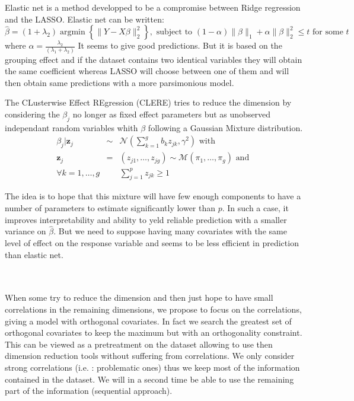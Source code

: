 \documentclass[11pt,a4paper]{article}
\begin{document}
	Elastic net\cite{zou2005regularization}	is a method developped to be a compromise between Ridge regression and the LASSO. 
	Elastic net can be written:
	\begin{equation}
		\hat{\beta}=(1+\lambda_2) \operatorname{argmin}\left\lbrace \parallel Y-X\beta \parallel_2^2 \right\rbrace, \textrm{ subject to } (1-\alpha)\parallel\beta\parallel_1+\alpha\parallel\beta\parallel_2^2\leq t \textrm{ for some } t
	\end{equation}
	where $\alpha=\frac{\lambda_2}{(\lambda_1+\lambda_2)}$
	It seems to give good predictions. But it is based on the grouping effect and if the dataset contains two identical variables they will obtain the same coefficient whereas LASSO will choose between one of them and will then obtain same predictions with a more parsimonious model. 
	
	The CLusterwise Effect REgression\cite{yengo2012variable} (CLERE) tries to reduce the dimension by considering the $\beta_j$ no longer as fixed effect parameters but as unobserved independant random variables whith $\beta$ following a Gaussian Mixture distribution. 
\begin{eqnarray}
	\beta_j|\mathbf{z}_j &\sim& \mathcal{N}(\sum_{k=1}^gb_kz_{jk},\gamma^2) \textrm{ with }\\
	\mathbf{z}_j&=&(z_{j1},\dots,z_{jg})\sim \mathcal{M}(\pi_1,\dots,\pi_g) \textrm{ and }\\
	\forall k=1,\dots ,g &&\sum_{j=1}^pz_{jk}\geq 1
\end{eqnarray}

The idea is to hope that this mixture will have few enough components to have a number of parameters to estimate significantly lower than $p$. In such a case, it improves interpretability and ability to yeld reliable prediction with a smaller variance on $\hat{\beta}$. But we need to suppose having many covariates with the same level of effect on the response variable and seems to be less efficient in prediction than elastic net.
	

	~\\	~\\

 When some try to reduce the dimension and then just hope to have small correlations in the remaining dimensions, we propose to focus on the correlations, giving a model with orthogonal covariates. In fact we search the greatest set of orthogonal covariates to keep the maximum but with an orthogonality constraint. This can be viewed as a pretreatment on the dataset allowing to use then dimension reduction tools without suffering from correlations. We only consider strong correlations (i.e. : problematic ones) thus we keep most of the information contained in the dataset. We will in a second time be able to use the remaining part of the information (sequential approach).	
 
\end{document}
